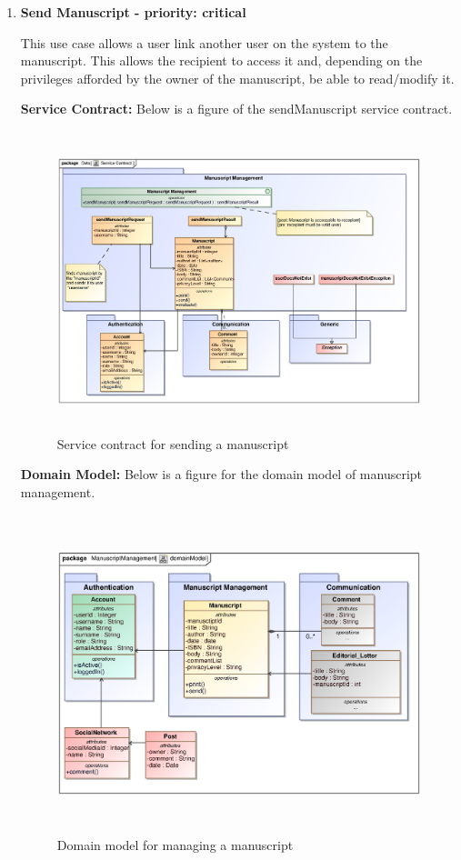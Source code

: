 \documentclass[12pt]{article}
\begin{document}
\begin{enumerate}
\newpage
\item \textbf{Send Manuscript - priority: critical}
\par {This use case allows a user link another user on the system to the manuscript. This allows the recipient to access it and, depending on the privileges afforded by the owner of the manuscript, be able to read/modify it.}

\textbf{Service Contract:} Below is a figure of the sendManuscript service contract.

\begin{figure}[h]
\includegraphics[height=330px, width=500px]{epsImages/ManuscriptManagement/sendManuscriptServiceContract.eps}
\caption{Service contract for sending a manuscript}
\end{figure}
 \newpage
\textbf{Domain Model:} Below is a figure for the domain model of manuscript management. 

 \begin{figure}[h]
\includegraphics[height=350px, width=500px]{epsImages/DomainModels/ManuscriptManagement.eps}
\caption{Domain model for managing a manuscript}
\end{figure}

\end{enumerate}
\newpage
\end{document}
